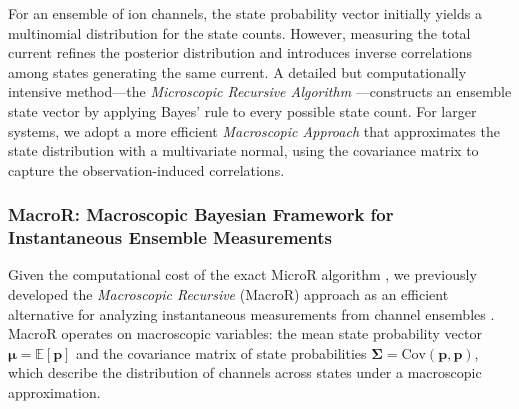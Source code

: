 \documentclass[pdflatex,sn-nature]{sn-jnl}%
\begin{document}
For an ensemble of ion channels, the state probability vector initially yields a multinomial distribution for the state counts. However, measuring the total current refines the posterior distribution and introduces inverse correlations among states generating the same current. A detailed but computationally intensive method—the \textit{Microscopic Recursive Algorithm} \cite{Moffatt}—constructs an ensemble state vector by applying Bayes’ rule to every possible state count. For larger systems, we adopt a more efficient \textit{Macroscopic Approach} that approximates the state distribution with a multivariate normal, using the covariance matrix to capture the observation-induced correlations.

\subsubsection{MacroR: Macroscopic Bayesian Framework for Instantaneous Ensemble Measurements}

Given the computational cost of the exact MicroR algorithm , we previously developed the \textit{Macroscopic Recursive} (MacroR) approach as an efficient alternative for analyzing instantaneous measurements from channel ensembles \cite{Moffatt}. MacroR operates on macroscopic variables: the mean state probability vector \( \boldsymbol{\mu} = \mathbb{E}[\boldsymbol{p}] \) and the covariance matrix of state probabilities \( \boldsymbol{\Sigma} = \text{Cov}(\boldsymbol{p}, \boldsymbol{p}) \), which describe the distribution of channels across states under a macroscopic approximation. 
\end{document}
